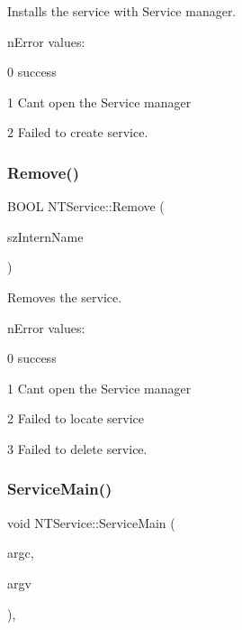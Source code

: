 Installs the service with Service manager.

n\+Error values\+:
\begin{DoxyItemize}
\item 0 success
\item 1 Can\textquotesingle{}t open the Service manager
\item 2 Failed to create service. 
\end{DoxyItemize}\mbox{\label{classNTService_a24da61426d7e37165a94a421f58737e0}} 
\subsubsection{\texorpdfstring{Remove()}{Remove()}}
{\footnotesize\ttfamily B\+O\+OL N\+T\+Service\+::\+Remove (\begin{DoxyParamCaption}\item[{L\+P\+C\+S\+TR}]{sz\+Intern\+Name }\end{DoxyParamCaption})}

Removes the service.

n\+Error values\+:
\begin{DoxyItemize}
\item 0 success
\item 1 Can\textquotesingle{}t open the Service manager
\item 2 Failed to locate service
\item 3 Failed to delete service. 
\end{DoxyItemize}\mbox{\label{classNTService_a8b34dc5c32e42c3ec151e82f7a25474a}} 
\subsubsection{\texorpdfstring{Service\+Main()}{ServiceMain()}}
{\footnotesize\ttfamily void N\+T\+Service\+::\+Service\+Main (\begin{DoxyParamCaption}\item[{D\+W\+O\+RD}]{argc,  }\item[{L\+P\+T\+S\+TR $\ast$}]{argv }\end{DoxyParamCaption})\hspace{0.3cm}{\ttfamily [static]}, {\ttfamily [protected]}}

